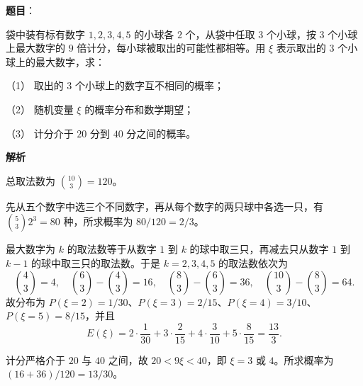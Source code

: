 \begin{answer}

\textbf{题目}：

袋中装有标有数字 $1,2,3,4,5$ 的小球各 $2$ 个，从袋中任取 $3$ 个小球，按 $3$ 个小球上最大数字的 $9$ 倍计分，每小球被取出的可能性都相等。用 $\xi$ 表示取出的 $3$ 个小球上的最大数字，求：

（1） 取出的 $3$ 个小球上的数字互不相同的概率；

（2） 随机变量 $\xi$ 的概率分布和数学期望；

（3） 计分介于 $20$ 分到 $40$ 分之间的概率。

\textbf{解析}

总取法数为 $\binom{10}{3}=120$。


先从五个数字中选三个不同数字，再从每个数字的两只球中各选一只，有 $\binom53 2^3=80$ 种，所求概率为 $80/120=2/3$。


最大数字为 $k$ 的取法数等于从数字 $1$ 到 $k$ 的球中取三只，再减去只从数字 $1$ 到 $k-1$ 的球中取三只的取法数。于是 $k=2,3,4,5$ 的取法数依次为
\nopagebreak[4]
\[
\binom43=4,\quad \binom63-\binom43=16,\quad
\binom83-\binom63=36,\quad \binom{10}3-\binom83=64.
\]
故分布为 $P(\xi=2)=1/30$、$P(\xi=3)=2/15$、$P(\xi=4)=3/10$、$P(\xi=5)=8/15$，并且
\nopagebreak[4]
\[
E(\xi)=2\cdot\frac1{30}+3\cdot\frac2{15}+4\cdot\frac3{10}+5\cdot\frac8{15}=\frac{13}{3}.
\]


计分严格介于 $20$ 与 $40$ 之间，故 $20<9\xi<40$，即 $\xi=3$ 或 $4$。所求概率为 $(16+36)/120=13/30$。




\end{answer}
